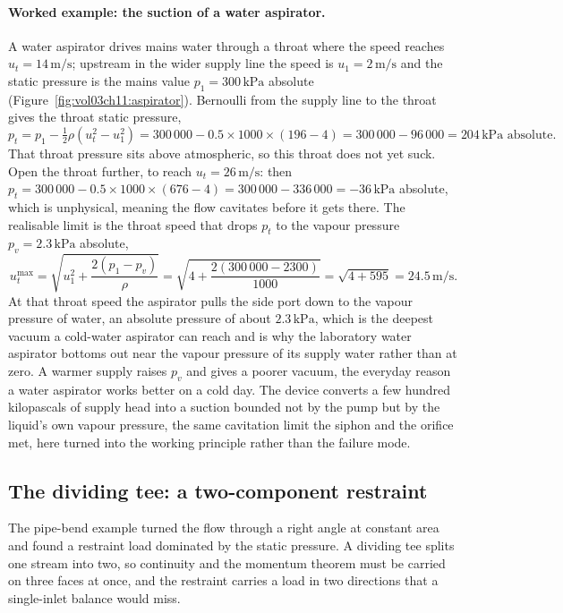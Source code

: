 

\paragraph{Worked example: the suction of a water aspirator.} A water
aspirator drives mains water through a throat where the speed reaches
$u_t = 14\,\si{\meter\per\second}$; upstream in the wider supply line
the speed is $u_1 = 2\,\si{\meter\per\second}$ and the static pressure
is the mains value $p_1 = 300\,\text{kPa}$ absolute
(Figure~\ref{fig:vol03ch11:aspirator}). Bernoulli from the supply line
to the throat gives the throat static pressure,
\[
p_t = p_1 - \tfrac12\rho(u_t^2 - u_1^2)
= 300\,000 - 0.5\times 1000\times(196 - 4)
= 300\,000 - 96\,000
= 204\,\text{kPa absolute}.
\]
That throat pressure sits above atmospheric, so this throat does not
yet suck. Open the throat further, to reach $u_t =
26\,\si{\meter\per\second}$: then $p_t = 300\,000 - 0.5\times 1000
\times(676 - 4) = 300\,000 - 336\,000 = -36\,\text{kPa}$ absolute,
which is unphysical, meaning the flow cavitates before it gets there.
The realisable limit is the throat speed that drops $p_t$ to the
vapour pressure $p_v = 2.3\,\text{kPa}$ absolute,
\[
u_t^{\max} = \sqrt{u_1^2 + \frac{2(p_1 - p_v)}{\rho}}
= \sqrt{4 + \frac{2(300\,000 - 2300)}{1000}}
= \sqrt{4 + 595}
= 24.5\,\si{\meter\per\second}.
\]
At that throat speed the aspirator pulls the side port down to the
vapour pressure of water, an absolute pressure of about
$2.3\,\text{kPa}$, which is the deepest vacuum a cold-water aspirator
can reach and is why the laboratory water aspirator bottoms out near
the vapour pressure of its supply water rather than at zero. A warmer
supply raises $p_v$ and gives a poorer vacuum, the everyday reason a
water aspirator works better on a cold day. The device converts a
few hundred kilopascals of supply head into a suction bounded not by
the pump but by the liquid's own vapour pressure, the same cavitation
limit the siphon and the orifice met, here turned into the working
principle rather than the failure mode.

\subsection{The dividing tee: a two-component restraint}

The pipe-bend example turned the flow through a right angle at
constant area and found a restraint load dominated by the static
pressure. A dividing tee splits one stream into two, so continuity and
the momentum theorem must be carried on three faces at once, and the
restraint carries a load in two directions that a single-inlet balance
would miss.


